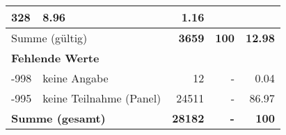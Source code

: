 \begin{longtable}{lXrrr}
       \num{328} &
       \num[round-mode=places,round-precision=2]{8,96} &
         \num[round-mode=places,round-precision=2]{1,16} \\
     \midrule
     \multicolumn{2}{l}{Summe (gültig)} &
       \textbf{\num{3659}} &
     \textbf{100} &
       \textbf{\num[round-mode=places,round-precision=2]{12,98}} \\
     \multicolumn{5}{l}{\textbf{Fehlende Werte}}\\
       -998 &
       keine Angabe &
         \num{12} &
        - &
         \num[round-mode=places,round-precision=2]{0,04} \\
       -995 &
       keine Teilnahme (Panel) &
         \num{24511} &
        - &
         \num[round-mode=places,round-precision=2]{86,97} \\
     \midrule
     \multicolumn{2}{l}{\textbf{Summe (gesamt)}} &
          \textbf{\num{28182}} &
        \textbf{-} &
        \textbf{100} \\
     \bottomrule
     \end{longtable}
     
